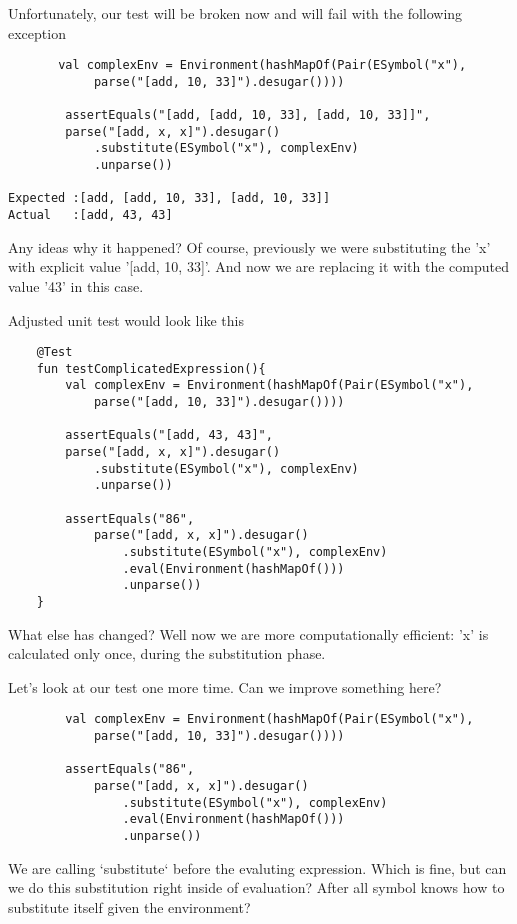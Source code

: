 \documentclass[11pt]{article}
\begin{document}
Unfortunately, our test will be broken now and will fail with the following exception
\begin{verbatim}
       val complexEnv = Environment(hashMapOf(Pair(ESymbol("x"),
            parse("[add, 10, 33]").desugar())))

        assertEquals("[add, [add, 10, 33], [add, 10, 33]]",
        parse("[add, x, x]").desugar()
            .substitute(ESymbol("x"), complexEnv)
            .unparse())

Expected :[add, [add, 10, 33], [add, 10, 33]]
Actual   :[add, 43, 43]
\end{verbatim}

Any ideas why it happened?
Of course, previously we were substituting the 'x' with explicit value '[add, 10, 33]'.
And now we are replacing it with the computed value '43' in this case.

Adjusted unit test would look like this

\begin{verbatim}
    @Test
    fun testComplicatedExpression(){
        val complexEnv = Environment(hashMapOf(Pair(ESymbol("x"),
            parse("[add, 10, 33]").desugar())))

        assertEquals("[add, 43, 43]",
        parse("[add, x, x]").desugar()
            .substitute(ESymbol("x"), complexEnv)
            .unparse())

        assertEquals("86",
            parse("[add, x, x]").desugar()
                .substitute(ESymbol("x"), complexEnv)
                .eval(Environment(hashMapOf()))
                .unparse())
    }
\end{verbatim}

What else has changed?
Well now we are more computationally efficient: 'x' is calculated only once, during the substitution phase.


Let's look at our test one more time.
Can we improve something here?
\begin{verbatim}
        val complexEnv = Environment(hashMapOf(Pair(ESymbol("x"),
            parse("[add, 10, 33]").desugar())))

        assertEquals("86",
            parse("[add, x, x]").desugar()
                .substitute(ESymbol("x"), complexEnv)
                .eval(Environment(hashMapOf()))
                .unparse())
\end{verbatim}

We are calling `substitute` before the evaluting expression.
Which is fine, but can we do this substitution right inside of evaluation?
After all symbol knows how to substitute itself given the environment?
\end{document}
